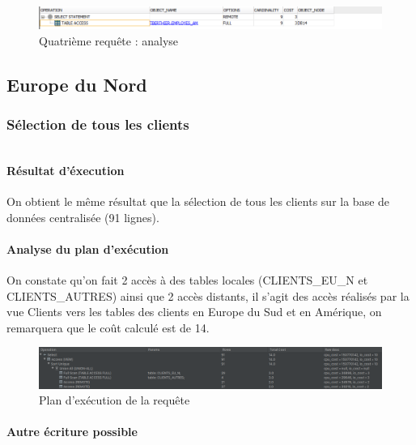 \documentclass[10pt,a4paper]{article}
\theoremstyle{plain}
\begin{document}
\begin{figure}[H]
    \centering
    \includegraphics[width=15cm]{EUS_req4_analyse.png}
    \caption{Quatrième requête : analyse}
\end{figure}
\newpage

\subsection{Europe du Nord}

\subsubsection{Sélection de tous les clients}

\inputminted{sql}{INSA-DB12-EuropeNord-req1.sql}

\paragraph{Résultat d'éxecution}

On obtient le même résultat que la sélection de tous les clients sur la base de données centralisée (91 lignes).

\paragraph{Analyse du plan d'exécution}

On constate qu'on fait 2 accès à des tables locales (CLIENTS\_EU\_N et CLIENTS\_AUTRES) ainsi que 2 accès distants, il s'agit des accès réalisés par la vue Clients vers les tables des clients en Europe du Sud et en Amérique, on remarquera que le coût calculé est de 14.

\begin{figure}[H]
    \centering
    \includegraphics[width=15cm]{INSA-DB12-EuropeNord-plan-exec-vues-distante1.png}
    \caption{Plan d'exécution de la requête}
\end{figure}

\paragraph{Autre écriture possible}
\end{document}
